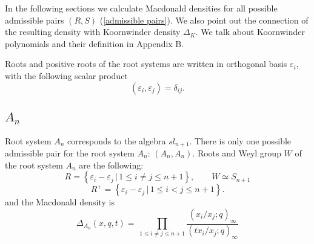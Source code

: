 \documentclass{article}
\def\ve{\varepsilon}
\begin{document}
In the following sections we calculate Macdonald densities for all possible admissible pairs $(R,S)$ (\ref{admissible pairs}). We also point out the connection of the resulting density with Koornwinder density $\Delta_K$. We talk about Koornwinder polynomials and their definition in Appendix B.

Roots and positive roots of the root systems are written in orthogonal basis $\ve_i$, with  the following scalar product
\begin{equation}
    (\ve_i,\ve_j) = \delta_{ij}.
\end{equation}


\subsection*{$A_n$}
Root system $A_n$ corresponds to the algebra $sl_{n+1}$. There is only one possible admissible pair for the root system $A_n$: $(A_n,A_n)$. Roots and Weyl group $W$ of the root system $A_n$ are the following:
\begin{equation}
    R = \left\{\ve_i-\ve_j\,|\, 1\leq i \neq j \leq n+1\right\}, \quad\quad W \simeq S_{n+1} \end{equation}
 \begin{equation}
    R^{+} = \left\{\ve_i-\ve_j\,|\, 1\leq i < j \leq n+1\right\}.
    \end{equation}
and the Macdonald density is
\begin{equation}
    \Delta_{A_n}(x,q,t) =\, \prod_{1\leq i \neq j \leq n+1} \frac{\left(x_i/x_j; q\right)_{\infty}}{\left(t x_i/x_j;q\right)_{\infty}}
\end{equation}
\end{document}
